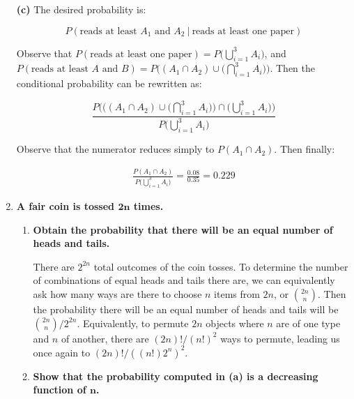 \documentclass[10pt, oneside]{article}   	%
\theoremstyle{definition}
\begin{document}
\begin{enumerate}[label=3.\arabic*]
\textbf{(c)} The desired probability is:

\[ P(\text{reads at least $A_1$ and $A_2$} \ | \ \text{reads at least one paper} ) \]

Observe that $P(\text{reads at least one paper}) = P \big( \bigcup^3_{i = 1} A_i \big)$, and $P(\text{reads at least $A$ and $B$}) = P\Big( (A_1 \cap A_2) \cup \Big( \bigcap^3_{i=1} A_i \Big) \Big)$. Then the conditional probability can be rewritten as:

\[ \frac{P\Big( \Big( (A_1 \cap A_2) \cup \Big( \bigcap^3_{i=1} A_i \Big) \Big) \cap \big( \bigcup^3_{i = 1} A_i \big) \Big)}{P \big( \bigcup^3_{i = 1} A_i \big)} \]

Observe that the numerator reduces simply to $P(A_1 \cap A_2)$. Then finally:

\begin{align*}
\frac{P(A_1 \cap A_2)}{P \big( \bigcup^3_{i = 1} A_i \big)} = \boxed{ \frac{0.08}{0.35} = 0.229}
\end{align*}

\newpage
\item  \begin{tcolorbox}[
  colback=Cerulean!5!white,
  colframe=Cerulean!75!black]
\textbf{A fair coin is tossed $\bm{2n}$ times.}
\end{tcolorbox}

	\begin{enumerate}
	\item  \begin{tcolorbox}[
	  colback=Cerulean!5!white,
	  colframe=Cerulean!75!black]
	\textbf{Obtain the probability that there will be an equal number of heads and tails.}
	\end{tcolorbox}
	
	There are $2^{2n}$ total outcomes of the coin tosses. To determine the number of combinations of equal heads and tails there are, we can equivalently ask how many ways are there to choose $n$ items from $2n$, or $\binom{2n}{n}$. Then the probability there will be an equal number of heads and tails will be $\boxed{ \binom{2n}{n} / 2^{2n} }$. Equivalently, to permute $2n$ objects where $n$ are of one type and $n$ of another, there are $(2n)! / (n!)^2$ ways to permute, leading us once again to $\boxed{(2n)! / ((n!) 2^{n})^2}$.
	
	\item  \begin{tcolorbox}[
	  colback=Cerulean!5!white,
	  colframe=Cerulean!75!black]
	\textbf{Show that the probability computed in (a) is a decreasing function of $\bm{n}$.}
	\end{tcolorbox}
	

\end{enumerate}
\end{enumerate}
\end{document}
